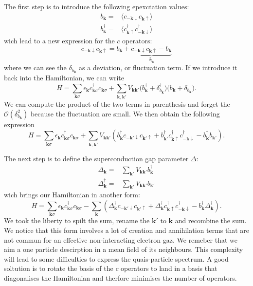 \documentclass[../main.tex]{subfile}
\begin{document}
The first step is to introduce the following epexctation values:
\begin{align}
    b_{\bm{k}} = &\langle c_{-\bm{k}\downarrow}c_{\bm{k}\uparrow}\rangle \label{eq:ExpectBCS} \\
    b_{\bm{k}}^{\dagger} = &\langle c_{\bm{k}\uparrow}^{\dagger}c_{-\bm{k}\downarrow}^{\dagger}\rangle  \label{eq:ExpectBCSDag}
\end{align}
wich lead to a new expression for the $c$ operators:
\begin{equation}
    c_{-\bm{k}\downarrow}c_{\bm{k}\uparrow} = b_{\bm{k}} + \underbrace{c_{-\bm{k}\downarrow}c_{\bm{k}\uparrow} - b_{\bm{k}}}_{\delta_{b_{\bm{k}}}}
\end{equation}
where we can see the $\delta_{b_{\bm{k}}}$ as a deviation, or fluctuation term. If we introduce it back into the Hamiltonian, we can write
\[
    H = \sum_{\bm{k}\sigma} \epsilon_{\bm{k}} c_{\bm{k}\sigma}^{\dagger}c_{\bm{k}\sigma} + \sum_{\bm{k},\bm{k}'} V_{\bm{k}\bm{k}'} \bigl( b_{\bm{k}}^{\dagger} + \delta_{b_{\bm{k}}}^{\dagger}\bigr)\bigl( b_{\bm{k}} + \delta_{b_{\bm{k}}}\bigr).
\]
We can compute the product of the two terms in parenthesis and forget the $\mathcal{O}\left(\delta_{b_{\bm{k}}}^2\right)$ because the fluctuation are small. We then obtain the following expression
\[
    H = \sum_{\bm{k}\sigma} \epsilon_{\bm{k}} c_{\bm{k}\sigma}^{\dagger}c_{\bm{k}\sigma} + \sum_{\bm{k},\bm{k}'} V_{\bm{k}\bm{k}'} \left( b_{\bm{k}}^{\dagger}c_{-\bm{k}'\downarrow}c_{\bm{k}'\uparrow}  + b_{\bm{k}'}^{\dagger} c_{\bm{k}\uparrow} ^{\dagger}c_{-\bm{k}\downarrow}^{\dagger} -  b_{\bm{k}}^{\dagger} b_{\bm{k}'}\right).
\]

The next step is to define the superconduction gap parameter $\Delta$:
\begin{align}
    \Delta_{\bm{k}} = &\sum_{\bm{k}'} V_{\bm{k}\bm{k}'} b_{\bm{k}}^{\dagger}\\
    \Delta^{\dagger}_{\bm{k}} = &\sum_{\bm{k}'} V_{\bm{k}\bm{k}'} b_{\bm{k}'}
\end{align}
wich brings our Hamiltonian in another form:
\begin{equation} \label{eq:HamiltonianBCS1}
    H = \sum_{\bm{k}\sigma} \epsilon_{\bm{k}} c_{\bm{k}\sigma}^{\dagger}c_{\bm{k}\sigma} - \sum_{\bm{k}} \left( \Delta_{\bm{k}}^{\dagger} c_{-\bm{k}'\downarrow}c_{\bm{k}'\uparrow}  + \Delta_{\bm{k}}^{\dagger} c_{\bm{k}\uparrow} ^{\dagger}c_{-\bm{k}\downarrow}^{\dagger} -  b_{\bm{k}}^{\dagger} \Delta_{\bm{k}}^{\dagger} \right).
\end{equation}
We took the liberty to spilt the sum, rename the $\bm{k}'$ to $\bm{k}$ and recombine the sum. We notice that this form involves a lot of creation and annihilation terms that 
are not commun for an effective non-interacting electron gaz. We remeber that we aim a one particle descirption in a mean field of its neighbours.
This complexity will lead to some difficulties to express the quais-particle spectrum. A good soltution is 
to rotate the basis of the $c$ operators to land in a basis that diagonalises the Hamiltonian and therfore minimises the number of operators.\\
\end{document}
